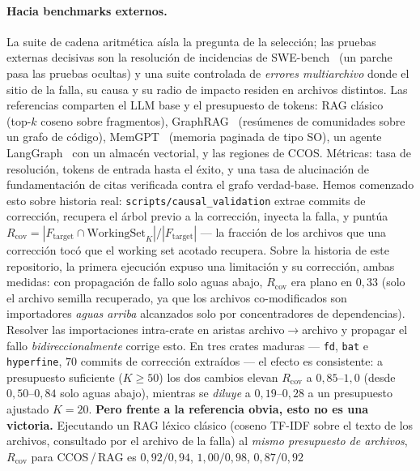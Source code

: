 \documentclass[11pt]{article}
\newcommand{\code}[1]{\texttt{#1}}
\begin{document}
\paragraph{Hacia benchmarks externos.} La suite de cadena aritmética aísla la pregunta
de la selección; las pruebas externas decisivas son la resolución de incidencias de
SWE-bench~\cite{jimenez2023swebench} (un parche pasa las pruebas ocultas) y una suite
controlada de \emph{errores multiarchivo} donde el sitio de la falla, su causa y su
radio de impacto residen en archivos distintos. Las referencias comparten el LLM base y
el presupuesto de tokens: RAG clásico~\cite{lewis2020rag} (top-$k$ coseno sobre
fragmentos), GraphRAG~\cite{edge2024graphrag} (resúmenes de comunidades sobre un grafo
de código), MemGPT~\cite{packer2023memgpt} (memoria paginada de tipo SO), un agente
LangGraph~\cite{langgraph} con un almacén vectorial, y las regiones de CCOS. Métricas:
tasa de resolución, tokens de entrada hasta el éxito, y una tasa de alucinación de
fundamentación de citas verificada contra el grafo verdad-base. Hemos comenzado esto
sobre historia real: \code{scripts/causal\_validation} extrae commits de corrección,
recupera el árbol previo a la corrección, inyecta la falla, y puntúa
$R_{\mathrm{cov}} = |F_{\mathrm{target}} \cap \mathrm{WorkingSet}_K| / |F_{\mathrm{target}}|$
--- la fracción de los archivos que una corrección tocó que el working set acotado
recupera. Sobre la historia de este repositorio, la primera ejecución expuso una
limitación y su corrección, ambas medidas: con propagación de fallo solo aguas abajo,
$R_{\mathrm{cov}}$ era plano en $0{,}33$ (solo el archivo semilla recuperado, ya que los
archivos co-modificados son importadores \emph{aguas arriba} alcanzados solo por
concentradores de dependencias). Resolver las importaciones intra-crate en aristas
archivo$\to$archivo y propagar el fallo \emph{bidireccionalmente} corrige esto. En tres
crates maduras --- \code{fd}, \code{bat} e \code{hyperfine}, $70$ commits de corrección
extraídos --- el efecto es consistente: a presupuesto suficiente ($K{\ge}50$) los dos
cambios elevan $R_{\mathrm{cov}}$ a $0{,}85$--$1{,}0$ (desde $0{,}50$--$0{,}84$ solo
aguas abajo), mientras se \emph{diluye} a $0{,}19$--$0{,}28$ a un presupuesto ajustado
$K{=}20$. \textbf{Pero frente a la referencia obvia, esto no es una victoria.}
Ejecutando un RAG léxico clásico (coseno TF-IDF sobre el texto de los archivos,
consultado por el archivo de la falla) al \emph{mismo presupuesto de archivos},
$R_{\mathrm{cov}}$ para CCOS\,/\,RAG es $0{,}92/0{,}94$, $1{,}00/0{,}98$, $0{,}87/0{,}92$
\end{document}
